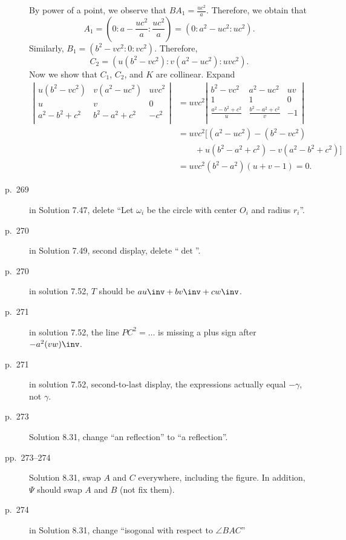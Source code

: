\documentclass[11pt]{scrartcl}
\begin{document}
\begin{description}
  By power of a point, we observe that $BA_1 = \frac{uc^2}{a}$.
  Therefore, we obtain that
  \[ A_1 = \left( 0:a-\frac{uc^2}{a}: \frac{uc^2}{a} \right)
    = \left( 0:a^{2}-uc^2 : uc^2 \right). \]
  Similarly, $B_1 = \left( b^2-vc^2 : 0 : vc^2 \right)$.
  Therefore,
  \[ C_2 = \left( u(b^2-vc^2) : v(a^2-uc^2) : uvc^2 \right). \]
  Now we show that $C_1$, $C_2$, and $K$ are collinear.
  Expand
  \begin{align*}
  \left\lvert
  \begin{array}{ccc}
    u (b^2-vc^2) & v (a^2-uc^2) & uv c^2 \\
    u & v & 0 \\
    a^2-b^2+c^2 & b^2-a^2+c^2 & -c^2 \\
  \end{array}
  \right\rvert
  &= uvc^2 \left\lvert
  \begin{array}{ccc}
    b^2-vc^2 & a^2-uc^2 & uv \\
    1 & 1 & 0 \\
    \frac{a^2-b^2+c^2}{u} & \frac{b^2-a^2+c^2}{v} & -1 \\
  \end{array}
  \right\rvert \\
  &= uvc^2 \Big[ (a^2-uc^2)-(b^2-vc^2) \\
    &\qquad+ u(b^2-a^2+c^2) - v(a^2-b^2+c^2) \Big] \\
    &= uvc^2 (b^2-a^2)(u+v-1) = 0.
  \end{align*}
\item[p.\  269] in Solution 7.47, delete ``Let $\omega_i$ be the circle with center $O_i$ and radius $r_i$''.
\item[p.\  270] in Solution 7.49, second display, delete ``$\det$''.
\item[p.\  270] in solution 7.52, $T$ should be $au\inv+bv\inv+cw\inv$.
\item[p.\  271] in solution 7.52, the line $PC^2 = \dots$ is missing a plus sign after $-a^2(vw)\inv$.
\item[p.\  271] in solution 7.52, second-to-last display,
  the expressions actually equal $-\gamma$, not $\gamma$.
\item[p.\ 273] Solution 8.31, change ``an reflection'' to ``a reflection''.
\item[pp.\ 273--274] Solution 8.31, swap $A$ and $C$ everywhere, including the figure.
  In addition, $\Psi$ should swap $A$ and $B$ (not fix them).
\item[p.\  274] in Solution 8.31, change ``isogonal with respect to $\angle{BAC}$''

\end{description}
\end{document}
